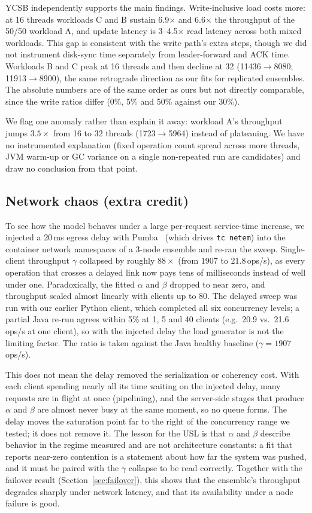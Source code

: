 \documentclass{llncs}
\begin{document}
YCSB independently supports the main findings. Write-inclusive load costs
more: at 16 threads workloads C and B sustain 6.9$\times$ and 6.6$\times$
the throughput of the 50/50 workload A, and update latency is 3--4.5$\times$
read latency across both mixed workloads. This gap is consistent with the
write path's extra steps, though we did not instrument disk-sync time
separately from leader-forward and ACK time. Workloads B and C peak at 16
threads and then decline at 32 (11436$\to$8080; 11913$\to$8900), the same
retrograde direction as our fits for replicated ensembles. The absolute
numbers are of the same order as ours but not directly comparable, since the
write ratios differ (0\%, 5\% and 50\% against our 30\%).

We flag one anomaly rather than explain it away: workload A's throughput
jumps $3.5\times$ from 16 to 32 threads (1723$\to$5964) instead of
plateauing. We have no instrumented explanation (fixed operation count spread
across more threads, JVM warm-up or GC variance on a single non-repeated run
are candidates) and draw no conclusion from that point.

\subsection{Network chaos (extra credit)}

To see how the model behaves under a large per-request service-time
increase, we injected a 20\,ms egress delay with Pumba~\cite{pumba} (which
drives \texttt{tc netem}) into the container network namespaces of a 3-node
ensemble and re-ran the sweep. Single-client throughput $\gamma$ collapsed by
roughly $88\times$ (from 1907 to 21.8\,ops/s), as every operation that crosses
a delayed link now pays tens of milliseconds instead of well under one.
Paradoxically, the fitted $\alpha$ and $\beta$ dropped to near zero, and
throughput scaled almost linearly with clients up to 80.
The delayed sweep was run with our earlier Python client, which completed all
six concurrency levels; a partial Java re-run agrees within 5\% at 1, 5 and 40
clients (e.g.\ 20.9 vs.\ 21.6\,ops/s at one client), so with the injected
delay the load generator is not the limiting factor. The ratio is taken
against the Java healthy baseline ($\gamma=1907$\,ops/s).

This does not mean the delay removed the serialization or coherency cost. With
each client spending nearly all its time waiting on the injected delay, many
requests are in flight at once (pipelining), and the server-side stages
that produce $\alpha$ and $\beta$ are almost never busy at the same moment,
so no queue forms. The delay moves the saturation point far to the right of
the concurrency range we tested; it does not remove it. The
lesson for the USL is that $\alpha$ and $\beta$ describe behavior in the
regime measured and are not architecture constants: a fit that reports
near-zero contention is a statement about how far the system was pushed, and it
must be paired with the $\gamma$ collapse to be read correctly. Together with
the failover result (Section~\ref{sec:failover}), this shows that
the ensemble's throughput degrades sharply under network latency, and that
its availability under a node failure is good.
\end{document}

